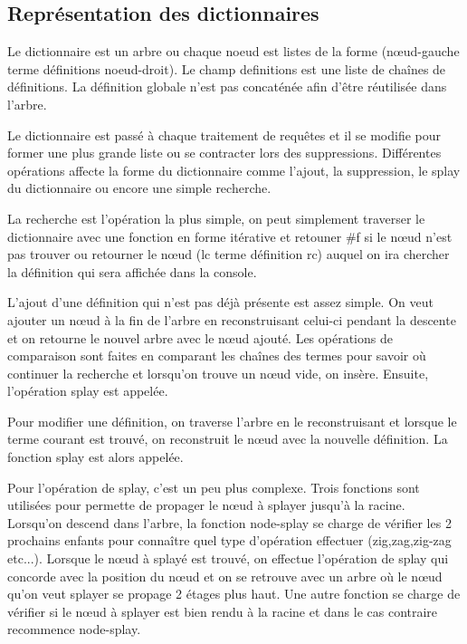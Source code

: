 \documentclass{article}
\begin{document}
  \subsection{Représentation des dictionnaires}
  Le dictionnaire est un arbre ou chaque noeud est listes de la forme
  \textsf{(nœud-gauche terme définitions noeud-droit)}. Le champ
  \textsf{definitions} est une liste de chaînes de définitions. La définition
  globale n'est pas concaténée afin d'être réutilisée dans l'arbre.

  

  Le dictionnaire est passé à chaque traitement de requêtes et il se modifie pour
  former une plus grande liste ou se contracter lors des suppressions.
  Différentes opérations affecte la forme du dictionnaire comme l'ajout, la
  suppression, le splay du dictionnaire ou encore une simple recherche.

  La recherche est l'opération la plus simple, on peut simplement traverser le
  dictionnaire avec une fonction en forme itérative et retouner \textsf{\#f} si
  le nœud n'est pas trouver ou retourner le nœud (lc terme définition rc) auquel
  on ira chercher la définition qui sera affichée dans la console.

  L'ajout d'une définition qui n'est pas déjà présente est assez simple. On veut
  ajouter un nœud à la fin de l'arbre en reconstruisant celui-ci  pendant la
  descente et on retourne le nouvel arbre avec le nœud ajouté. Les opérations de
  comparaison sont faites en comparant les chaînes des termes pour savoir où
  continuer la recherche et lorsqu'on trouve un nœud vide, on insère. Ensuite,
  l'opération splay est appelée.

  Pour modifier une définition, on traverse l'arbre en le reconstruisant et
  lorsque le terme courant est trouvé, on reconstruit le nœud avec la nouvelle
  définition. La fonction splay est alors appelée.

  Pour l'opération de splay, c'est un peu plus complexe. Trois fonctions sont
  utilisées pour permette de propager le nœud à splayer jusqu'à la racine.
  Lorsqu'on descend dans l'arbre, la fonction node-splay se charge de vérifier
  les 2 prochains enfants pour connaître quel type d'opération effectuer
  (zig,zag,zig-zag etc...). Lorsque le nœud à splayé est trouvé, on effectue
  l'opération de splay qui concorde avec la position du nœud et on se retrouve
  avec un arbre où le nœud qu'on veut splayer se propage 2 étages plus haut. Une
  autre fonction se charge de vérifier si le nœud à splayer est bien rendu à la
  racine et dans le cas contraire recommence node-splay.
\end{document}
